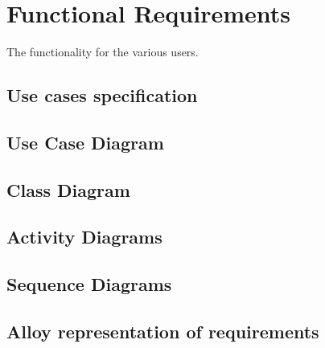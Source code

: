 \section{Functional Requirements}
The functionality for the various users.
\subsection{Use cases specification}

\subsection{Use Case Diagram}
\subsection{Class Diagram}
\subsection{Activity Diagrams}
\subsection{Sequence Diagrams}
\subsection{Alloy representation of requirements}
